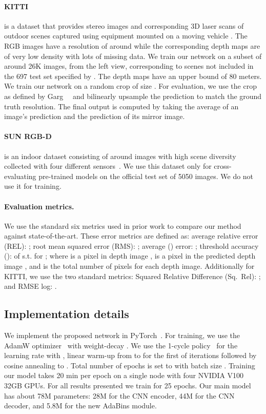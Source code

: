 \documentclass[final]{cvpr}
\begin{document}
\paragraph{KITTI} is a dataset that provides stereo images and corresponding 3D laser scans of outdoor scenes captured using equipment mounted on a moving vehicle \cite{geiger2013vision}. The RGB images have a resolution of around  while the corresponding depth maps are of very low density with lots of missing data. We train our network on a subset of around 26K images, from the left view, corresponding to scenes not included in the 697 test set specified by \cite{Eigen2014}. The depth maps have an upper bound of 80 meters. We train our network on a random crop of size . For evaluation, we use the crop as defined by Garg~\etal~\cite{garg10.1007/978-3-319-46484-8_45} and bilinearly upsample the prediction to match the ground truth resolution. The final output is computed by taking the average of an image's prediction and the prediction of its mirror image.

\paragraph{SUN RGB-D} is an indoor dataset consisting of around  images with high scene diversity collected with four different sensors~\cite{Song2015_sunrgbd,sun6751312,janoch2013category}. We use this dataset only for cross-evaluating pre-trained models on the official test set of 5050 images. We do not use it for training.

\paragraph{Evaluation metrics.} We use the standard six metrics used in prior work \cite{Eigen2014} to compare our method against state-of-the-art. These error metrics are defined as:
average relative error (REL): ;
root mean squared error (RMS): ;
average () error: ;
threshold accuracy ():  of  s.t.  for ;
where  is a pixel in depth image ,  is a pixel in the predicted depth image , and  is the total number of pixels for each depth image. 
Additionally for KITTI, we use the two standard metrics: Squared Relative Difference (Sq.~Rel): ; 
and RMSE log: .

\subsection{Implementation details}
We implement the proposed network in PyTorch~\cite{NEURIPS2019_bdbca288}. For training, we use the AdamW optimizer~\cite{Loshchilov2019DecoupledWD} with weight-decay . We use the 1-cycle policy~\cite{DBLP:journals/corr/abs-1708-07120} for the learning rate with , linear warm-up from  to  for the first  of iterations followed by cosine annealing to . Total number of epochs is set to  with batch size . Training our model takes 20 min per epoch on a single node with four NVIDIA V100 32GB GPUs. For all results presented we train for 25 epochs. 
Our main model has about 78M parameters: 28M for the CNN encoder, 44M for the CNN decoder, and 5.8M for the new AdaBins module.
\end{document}
